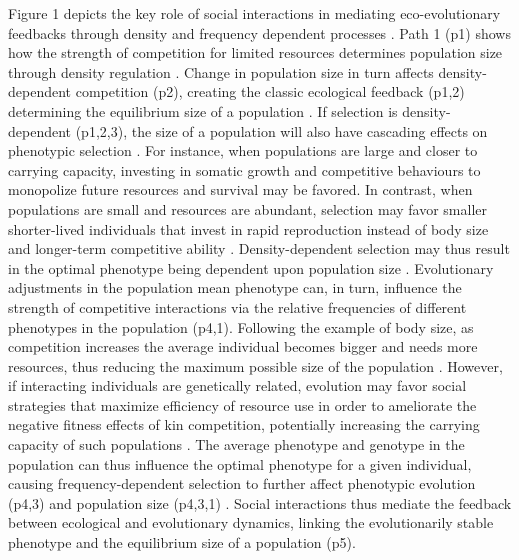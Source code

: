 \documentclass{article}
\begin{document}
 Figure 1 depicts the key role of social interactions in mediating eco-evolutionary feedbacks through density and frequency dependent processes \citep{Engen2020}. Path 1 (p1) shows how the strength of competition for limited resources determines population size through density regulation \citep{Gilpin1973a}. Change in population size in turn affects density-dependent competition (p2), creating the classic ecological feedback (p1,2) determining the equilibrium size of a population \citep{Travis2013}. If selection is density-dependent (p1,2,3), the size of a population will also have cascading effects on phenotypic selection  \citep{Mueller1997, Boyce1984}. For instance, when populations are large and closer to carrying capacity, investing in somatic growth and competitive behaviours to monopolize future resources and survival may be favored. In contrast, when populations are small and resources are abundant, selection may favor smaller shorter-lived individuals that invest in rapid reproduction instead of body size and longer-term competitive ability \citep{Joshi2001, Wright2018, Engen2017}. Density-dependent selection may thus result in the optimal phenotype being dependent upon population size \citep{Anderson1971, Charlesworth1971}. Evolutionary adjustments in the population mean phenotype can, in turn, influence the strength of competitive interactions via the relative frequencies of different phenotypes in the population \citep{Wright1969} (p4,1). Following the example of body size, as competition increases the average individual becomes bigger and needs more resources, thus reducing the maximum possible size of the population \citep{Engen2020}. However, if interacting individuals are genetically related, evolution may favor social strategies that maximize efficiency of resource use in order to ameliorate the negative fitness effects of kin competition, potentially increasing the carrying capacity of such populations \citep{Boyce1984, macarthur1967theory}. The average phenotype and genotype in the population can thus influence the optimal phenotype for a given individual, causing frequency-dependent selection to further affect phenotypic evolution (p4,3) \citep{Heino1998} and population size (p4,3,1) \citep{Svensson2018}. Social interactions thus mediate the feedback between ecological and evolutionary dynamics, linking the evolutionarily stable phenotype and the equilibrium size of a population (p5).
\end{document}
